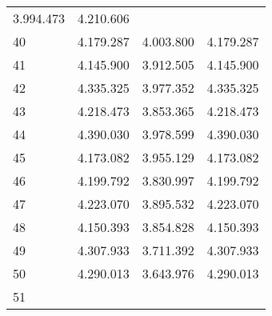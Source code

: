 \begin{tabular}{llll}
  \multicolumn{1}{r}{3.994.473} &
  \multicolumn{1}{r}{4.210.606} \\
\multicolumn{1}{l}{\hspace{1em}40} &
  \multicolumn{1}{|r}{4.179.287} &
  \multicolumn{1}{r}{4.003.800} &
  \multicolumn{1}{r}{4.179.287} \\
\multicolumn{1}{l}{\hspace{1em}41} &
  \multicolumn{1}{|r}{4.145.900} &
  \multicolumn{1}{r}{3.912.505} &
  \multicolumn{1}{r}{4.145.900} \\
\multicolumn{1}{l}{\hspace{1em}42} &
  \multicolumn{1}{|r}{4.335.325} &
  \multicolumn{1}{r}{3.977.352} &
  \multicolumn{1}{r}{4.335.325} \\
\multicolumn{1}{l}{\hspace{1em}43} &
  \multicolumn{1}{|r}{4.218.473} &
  \multicolumn{1}{r}{3.853.365} &
  \multicolumn{1}{r}{4.218.473} \\
\multicolumn{1}{l}{\hspace{1em}44} &
  \multicolumn{1}{|r}{4.390.030} &
  \multicolumn{1}{r}{3.978.599} &
  \multicolumn{1}{r}{4.390.030} \\
\multicolumn{1}{l}{\hspace{1em}45} &
  \multicolumn{1}{|r}{4.173.082} &
  \multicolumn{1}{r}{3.955.129} &
  \multicolumn{1}{r}{4.173.082} \\
\multicolumn{1}{l}{\hspace{1em}46} &
  \multicolumn{1}{|r}{4.199.792} &
  \multicolumn{1}{r}{3.830.997} &
  \multicolumn{1}{r}{4.199.792} \\
\multicolumn{1}{l}{\hspace{1em}47} &
  \multicolumn{1}{|r}{4.223.070} &
  \multicolumn{1}{r}{3.895.532} &
  \multicolumn{1}{r}{4.223.070} \\
\multicolumn{1}{l}{\hspace{1em}48} &
  \multicolumn{1}{|r}{4.150.393} &
  \multicolumn{1}{r}{3.854.828} &
  \multicolumn{1}{r}{4.150.393} \\
\multicolumn{1}{l}{\hspace{1em}49} &
  \multicolumn{1}{|r}{4.307.933} &
  \multicolumn{1}{r}{3.711.392} &
  \multicolumn{1}{r}{4.307.933} \\
\multicolumn{1}{l}{\hspace{1em}50} &
  \multicolumn{1}{|r}{4.290.013} &
  \multicolumn{1}{r}{3.643.976} &
  \multicolumn{1}{r}{4.290.013} \\
\multicolumn{1}{l}{\hspace{1em}51} &

\end{tabular}
